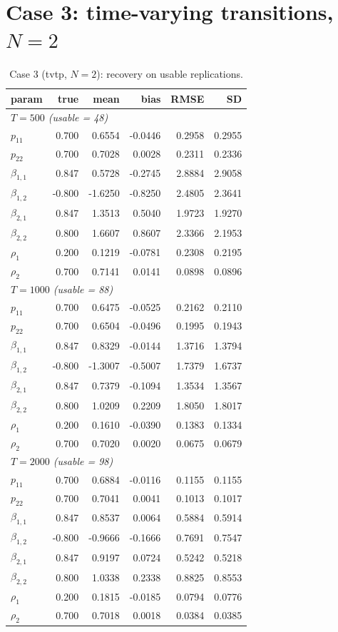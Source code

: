 \documentclass[11pt]{article}
\begin{document}
\section{Case 3: time-varying transitions, $N = 2$}
\begin{table}[!htbp]\centering\small
\caption{Case 3 (tvtp, $N=2$): recovery on usable replications.}\label{tab:c3}
\begin{tabular}{lrrrrr}
\toprule
param & true & mean & bias & RMSE & SD\\
\midrule\multicolumn{6}{l}{\emph{$T = 500$ (usable = 48)}}\\
$p_{11}$ & 0.700 & 0.6554 & -0.0446 & 0.2958 & 0.2955\\
$p_{22}$ & 0.700 & 0.7028 & 0.0028 & 0.2311 & 0.2336\\
$\beta_{1,1}$ & 0.847 & 0.5728 & -0.2745 & 2.8884 & 2.9058\\
$\beta_{1,2}$ & -0.800 & -1.6250 & -0.8250 & 2.4805 & 2.3641\\
$\beta_{2,1}$ & 0.847 & 1.3513 & 0.5040 & 1.9723 & 1.9270\\
$\beta_{2,2}$ & 0.800 & 1.6607 & 0.8607 & 2.3366 & 2.1953\\
$\rho_1$ & 0.200 & 0.1219 & -0.0781 & 0.2308 & 0.2195\\
$\rho_2$ & 0.700 & 0.7141 & 0.0141 & 0.0898 & 0.0896\\
\midrule\multicolumn{6}{l}{\emph{$T = 1000$ (usable = 88)}}\\
$p_{11}$ & 0.700 & 0.6475 & -0.0525 & 0.2162 & 0.2110\\
$p_{22}$ & 0.700 & 0.6504 & -0.0496 & 0.1995 & 0.1943\\
$\beta_{1,1}$ & 0.847 & 0.8329 & -0.0144 & 1.3716 & 1.3794\\
$\beta_{1,2}$ & -0.800 & -1.3007 & -0.5007 & 1.7379 & 1.6737\\
$\beta_{2,1}$ & 0.847 & 0.7379 & -0.1094 & 1.3534 & 1.3567\\
$\beta_{2,2}$ & 0.800 & 1.0209 & 0.2209 & 1.8050 & 1.8017\\
$\rho_1$ & 0.200 & 0.1610 & -0.0390 & 0.1383 & 0.1334\\
$\rho_2$ & 0.700 & 0.7020 & 0.0020 & 0.0675 & 0.0679\\
\midrule\multicolumn{6}{l}{\emph{$T = 2000$ (usable = 98)}}\\
$p_{11}$ & 0.700 & 0.6884 & -0.0116 & 0.1155 & 0.1155\\
$p_{22}$ & 0.700 & 0.7041 & 0.0041 & 0.1013 & 0.1017\\
$\beta_{1,1}$ & 0.847 & 0.8537 & 0.0064 & 0.5884 & 0.5914\\
$\beta_{1,2}$ & -0.800 & -0.9666 & -0.1666 & 0.7691 & 0.7547\\
$\beta_{2,1}$ & 0.847 & 0.9197 & 0.0724 & 0.5242 & 0.5218\\
$\beta_{2,2}$ & 0.800 & 1.0338 & 0.2338 & 0.8825 & 0.8553\\
$\rho_1$ & 0.200 & 0.1815 & -0.0185 & 0.0794 & 0.0776\\
$\rho_2$ & 0.700 & 0.7018 & 0.0018 & 0.0384 & 0.0385\\
\bottomrule
\end{tabular}
\end{table}
\end{document}
